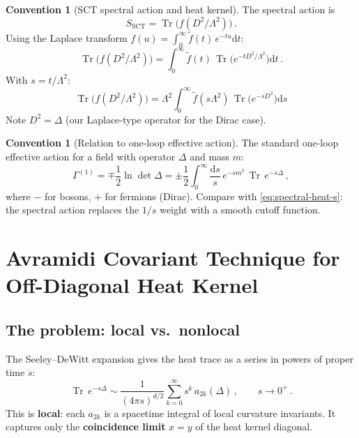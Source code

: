 \documentclass[12pt,a4paper]{article}
\theoremstyle{definition}
\newtheorem{convention}[proposition]{Convention}
\theoremstyle{remark}
\newcommand{\Tr}{\operatorname{Tr}}
\newcommand{\dd}{\mathrm{d}}
\begin{document}
\begin{convention}[SCT spectral action and heat kernel]
\label{conv:spectral}
The spectral action is
\begin{equation}
  S_{\text{SCT}} = \Tr\!\bigl(f(D^2/\Lambda^2)\bigr)\,.
  \label{eq:spectral-action}
\end{equation}
Using the Laplace transform $f(u) = \int_0^\infty \tilde{f}(t)\,
e^{-tu}\dd t$:
\begin{equation}
  \Tr\!\bigl(f(D^2/\Lambda^2)\bigr)
  = \int_0^\infty \tilde{f}(t)\,
    \Tr\!\bigl(e^{-t D^2/\Lambda^2}\bigr)\dd t\,.
  \label{eq:spectral-heat}
\end{equation}
With $s = t/\Lambda^2$:
\begin{equation}
  \boxed{
  \Tr\!\bigl(f(D^2/\Lambda^2)\bigr)
  = \Lambda^2\int_0^\infty \tilde{f}(s\Lambda^2)\,
    \Tr\!\bigl(e^{-s D^2}\bigr)\dd s
  }
  \label{eq:spectral-heat-s}
\end{equation}
Note $D^2 = \Delta$ (our Laplace-type operator for the Dirac case).
\end{convention}

\begin{convention}[Relation to one-loop effective action]
The standard one-loop effective action for a field with operator $\Delta$
and mass $m$:
\begin{equation}
  \Gamma^{(1)} = \mp\frac{1}{2}\ln\det\Delta
  = \pm\frac{1}{2}\int_0^\infty \frac{\dd s}{s}\,
    e^{-sm^2}\,\Tr\,e^{-s\Delta}\,,
  \label{eq:eff-action}
\end{equation}
where $-$ for bosons, $+$ for fermions (Dirac).
Compare with \eqref{eq:spectral-heat-s}: the spectral action replaces
the $1/s$ weight with a smooth cutoff function.
\end{convention}


\newpage
\section{Avramidi Covariant Technique for Off-Diagonal Heat Kernel}
\label{sec:avramidi}

\subsection{The problem: local vs.\ nonlocal}

The Seeley--DeWitt expansion gives the heat trace as a series in
powers of proper time $s$:
\begin{equation}
  \Tr\,e^{-s\Delta} \sim \frac{1}{(4\pi s)^{d/2}}
  \sum_{k=0}^\infty s^k\, a_{2k}(\Delta)\,,
  \qquad s \to 0^+\,.
  \label{eq:SD-expansion}
\end{equation}
This is \textbf{local}: each $a_{2k}$ is a spacetime integral of local
curvature invariants.  It captures only the \textbf{coincidence limit}
$x=y$ of the heat kernel diagonal.
\end{document}
